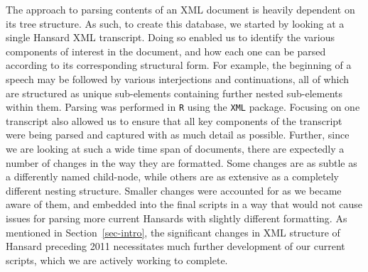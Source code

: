 \documentclass[
  letterpaper,
  DIV=11,
  numbers=noendperiod]{scrartcl}
\begin{document}
The approach to parsing contents of an XML document is heavily dependent
on its tree structure. As such, to create this database, we started by
looking at a single Hansard XML transcript. Doing so enabled us to
identify the various components of interest in the document, and how
each one can be parsed according to its corresponding structural form.
For example, the beginning of a speech may be followed by various
interjections and continuations, all of which are structured as unique
sub-elements containing further nested sub-elements within them. Parsing
was performed in \texttt{R} using the \texttt{XML} package. Focusing on
one transcript also allowed us to ensure that all key components of the
transcript were being parsed and captured with as much detail as
possible. Further, since we are looking at such a wide time span of
documents, there are expectedly a number of changes in the way they are
formatted. Some changes are as subtle as a differently named child-node,
while others are as extensive as a completely different nesting
structure. Smaller changes were accounted for as we became aware of
them, and embedded into the final scripts in a way that would not cause
issues for parsing more current Hansards with slightly different
formatting. As mentioned in Section~\ref{sec-intro}, the significant
changes in XML structure of Hansard preceding 2011 necessitates much
further development of our current scripts, which we are actively
working to complete.
\end{document}
